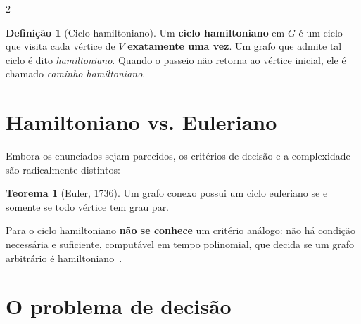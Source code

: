 \documentclass[10pt,a4paper]{article}
\theoremstyle{definition}
\newtheorem{defn}{Definição}
\newtheorem{teo}{Teorema}
\begin{document}
\begin{multicols}{2}
\begin{defn}[Ciclo hamiltoniano]
Um \textbf{ciclo hamiltoniano} em $G$ é um ciclo que visita cada vértice de $V$ \textbf{exatamente uma vez}. Um grafo que admite tal ciclo é dito \emph{hamiltoniano}. Quando o passeio não retorna ao vértice inicial, ele é chamado \emph{caminho hamiltoniano}.
\end{defn}

\section{Hamiltoniano vs. Euleriano}

Embora os enunciados sejam parecidos, os critérios de decisão e a complexidade são radicalmente distintos:

\vspace{4pt}
\noindent
{}
\vspace{4pt}

\begin{teo}[Euler, 1736]
Um grafo conexo possui um ciclo euleriano se e somente se todo vértice tem grau par.
\end{teo}

Para o ciclo hamiltoniano \textbf{não se conhece} um critério análogo: não há condição necessária e suficiente, computável em tempo polinomial, que decida se um grafo arbitrário é hamiltoniano~\citep{sipser2005,bondy2008}.

\section{O problema de decisão}


\end{multicols}
\end{document}
